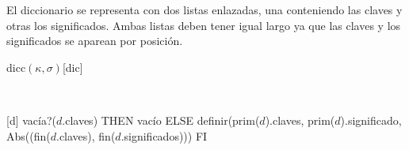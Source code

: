 \documentclass[a4paper,10pt]{article}
\begin{document}
\begin{Representacion}
  

  El diccionario se representa con dos listas enlazadas, una conteniendo las
    claves y otras los significados. Ambas listas deben tener igual largo ya
    que las claves y los significados se aparean por posición.

  \begin{Estructura}{dicc$(\kappa,\sigma)$}[dic]
    \begin{Tupla}[dic]%
    \end{Tupla}
  \end{Estructura}


  ~

  [d]{
      \IF vacía?($d$.claves) THEN vacío ELSE
      definir(prim($d$).claves, prim($d$).significado, 
              Abs((fin($d$.claves), fin($d$.significados))) FI}


\end{Representacion}
\end{document}
